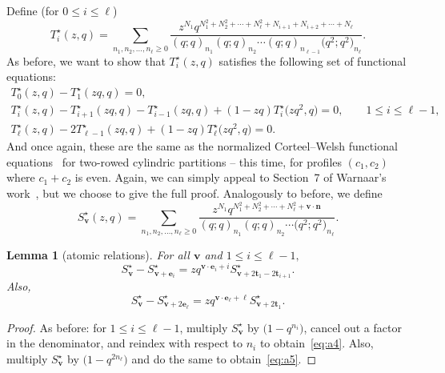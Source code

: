\documentclass[pdftex]{sigma}
\numberwithin{equation}{section}
\newtheorem{Lemma}[Theorem]{Lemma}
\theoremstyle{definition}
\newcommand{\tr}{\mathbf{t}}
\newcommand{\nn}{\mathbf{n}}
\newcommand{\vv}{\mathbf{v}}
\newcommand{\ee}{\mathbf{e}}
\begin{document}
Define (for $0 \le i \le \ell$)
\begin{equation} \label{eq:Tstardefn}
T^\star_i(z,q)=\sum_{n_1,n_2,\dots,n_{\ell}\ge 0} \frac{z^{N_1}q^{N_1^2+N_2^2+\cdots+N_{\ell}^2+N_{i+1}+N_{i+2}+\cdots+N_{\ell}}}{(q;q)_{n_1}(q;q)_{n_2} \cdots(q;q)_{n_{\ell-1}}\bigl(q^2;q^2\bigr)_{n_{\ell}}}.
\end{equation}
As before, we want to show that $T^\star_i(z,q)$ satisfies the following set of functional equations:
\begin{gather}
T^\star_0(z,q)-T^\star_1(zq,q) =0, \label{eq:newTsarrec1} \\
T^\star_i(z,q) - T^\star_{i+1}(zq,q) - T^\star_{i-1}(zq,q) + (1-zq)T^\star_{i}\bigl(zq^2,q\bigr) =0, \qquad 1 \le i \le \ell-1, \label{eq:newTsarrec2} \\
T^\star_\ell(z,q) - 2T^\star_{\ell-1}(zq,q) + (1-zq) T^\star_{\ell}\bigl(zq^2,q\bigr) = 0. \label{eq:newTsarrec3}
\end{gather}
And once again, these are the same as the normalized Corteel--Welsh functional equations~\cite{CW} for two-rowed cylindric partitions -- this time, for profiles $(c_1,c_2)$ where $c_1+c_2$ is even. Again, we can simply appeal to Section~7 of Warnaar's work~\cite{WarnCyl}, but we choose to give the full proof. Analogously to before, we define
\begin{equation*}
S^\star_\vv(z,q)=\sum_{n_1,n_2,\dots,n_{\ell}\ge 0} \frac{z^{N_1}q^{N_1^2+N_2^2+\cdots+N_{\ell}^2+\vv \cdot \nn}}{(q;q)_{n_1}(q;q)_{n_2}\cdots\bigl(q^2;q^2\bigr)_{n_{\ell}}}.
\end{equation*}

\begin{Lemma}[atomic relations]
For all $\vv$ and $1\le i \le \ell-1,$
\begin{equation} \label{eq:a4}
S^\star_\vv - S^\star_{\vv+\ee_i} = zq^{\vv\cdot\ee_i+i} S^\star_{\vv+2\tr_1-2\tr_{i+1}}.
\end{equation}
Also,
\begin{equation} \label{eq:a5}
S^\star_\vv - S^\star_{\vv+2\ee_\ell} = zq^{\vv\cdot\ee_\ell+\ell} S^\star_{\vv+2\tr_1}.
\end{equation}
\end{Lemma}
\begin{proof}
As before: for $1\le i \le \ell-1$, multiply $S^\star_\vv$ by $\bigl(1-q^{n_i}\bigr)$, cancel out a factor in the denominator, and reindex with respect to $n_i$ to obtain~\eqref{eq:a4}. Also, multiply $S^\star_\vv$ by $\bigl(1-q^{2n_\ell}\bigr)$ and do the same to obtain~\eqref{eq:a5}.
\end{proof}
\end{document}
